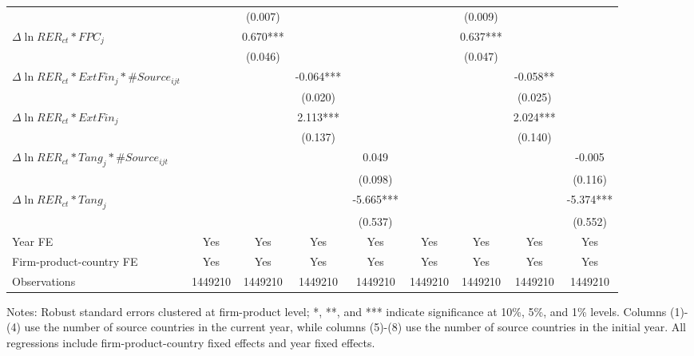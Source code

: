 \begin{table}
{\begin{threeparttable}
\begin{tabular}{lcccccccc}
			&   & (0.007) &       &       &       & (0.009) &       &  \\
			$\Delta \ln RER_{ct}*FPC_{j}$ &  & 0.670*** &       &       &       & 0.637*** &       &  \\
			&   & (0.046) &       &       &       & (0.047) &       &  \\
			$\Delta \ln RER_{ct}*ExtFin_{j}*\#Source_{ijt}$ &   &       & -0.064*** &       &       &       & -0.058** &  \\
			&   &       & (0.020) &       &       &       & (0.025) &  \\
			$\Delta \ln RER_{ct}*ExtFin_{j}$ &     &       & 2.113*** &       &       &       & 2.024*** &  \\
			&   &       & (0.137) &       &       &       & (0.140) &  \\
			$\Delta \ln RER_{ct}*Tang_{j}*\#Source_{ijt}$ &    &       &       & 0.049 &       &       &       & -0.005 \\
			&    &       &       & (0.098) &       &       &       & (0.116) \\
			$\Delta \ln RER_{ct}*Tang_{j}$ &   &       &       & -5.665*** &       &       &       & -5.374*** \\
			&  &       &       & (0.537) &       &       &       & (0.552) \\
			Year FE  & Yes   & Yes   & Yes   & Yes & Yes   & Yes   & Yes   & Yes\\
			Firm-product-country FE & Yes   & Yes   & Yes   & Yes & Yes   & Yes   & Yes   & Yes\\
			Observations & 1449210 & 1449210 & 1449210 & 1449210 & 1449210 & 1449210 & 1449210 & 1449210\\
			\bottomrule
		\end{tabular}
		\begin{tablenotes}
			\footnotesize
			\item[Notes:] Robust standard errors clustered at firm-product level; *, **, and *** indicate significance at 10\%, 5\%, and 1\% levels. Columns (1)-(4) use the number of source countries in the current year, while columns (5)-(8) use the number of source countries in the initial year. All regressions include firm-product-country fixed effects and year fixed effects.
		\end{tablenotes}
	\end{threeparttable}
	}
	\label{tab.source}
\end{table}

